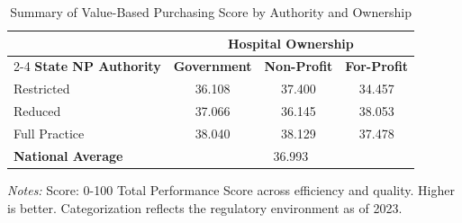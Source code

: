 \begin{table}[htbp]
    \centering
    \caption{Summary of Value-Based Purchasing Score by Authority and Ownership}
    \label{tab:hvbp_tps_score_own}
    \vspace{0.2cm}
    \begin{tabular}{lccc}
        \toprule
        & \multicolumn{3}{c}{\textbf{Hospital Ownership}} \\
        \cmidrule(lr){2-4}
        \textbf{State NP Authority} & \textbf{Government} & \textbf{Non-Profit} & \textbf{For-Profit} \\
        \midrule
        Restricted & 36.108 & 37.400 & 34.457 \\
        Reduced & 37.066 & 36.145 & 38.053 \\
        Full Practice & 38.040 & 38.129 & 37.478 \\
        \midrule
        \textbf{National Average} & \multicolumn{3}{c}{36.993} \\
        \bottomrule
    \end{tabular}
    \vspace{0.1cm}
    \begin{minipage}{0.85\textwidth}
        \footnotesize \textit{Notes:} Score: 0-100 Total Performance Score across efficiency and quality. Higher is better. Categorization reflects the regulatory environment as of 2023.
    \end{minipage}
\end{table}